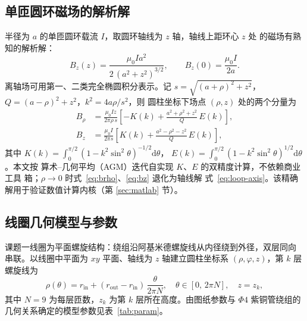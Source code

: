 \documentclass[zihao=-4,a4paper]{ctexart}
\numberwithin{figure}{section}
\numberwithin{table}{section}
\numberwithin{equation}{section}
\begin{document}
\subsection{单匝圆环磁场的解析解}

半径为 $a$ 的单匝圆环载流 $I$，取圆环轴线为 $z$ 轴，轴线上距环心 $z$ 处
的磁场有熟知的解析解：
\begin{equation}
  B_z(z) = \frac{\mu_0 I a^2}{2\,(a^2+z^2)^{3/2}},
  \qquad
  B_z(0) = \frac{\mu_0 I}{2a}.
  \label{eq:loop-axis}
\end{equation}
离轴场可用第一、二类完全椭圆积分表示\cite{smythe1989,jackson1999}。记
$s=\sqrt{(a+\rho)^2+z^2}$，$Q=(a-\rho)^2+z^2$，$k^2 = 4a\rho/s^2$，则
圆柱坐标下场点 $(\rho,z)$ 处的两个分量为
\begin{align}
  B_\rho &= \frac{\mu_0 I z}{2\pi \rho\, s}
            \left[ -K(k) + \frac{a^2+\rho^2+z^2}{Q}\,E(k) \right],
  \label{eq:brho}\\
  B_z    &= \frac{\mu_0 I}{2\pi s}
            \left[ K(k) + \frac{a^2-\rho^2-z^2}{Q}\,E(k) \right],
  \label{eq:bz}
\end{align}
其中 $K(k)=\int_0^{\pi/2}(1-k^2\sin^2\theta)^{-1/2}\mathrm{d}\theta$，
$E(k)=\int_0^{\pi/2}(1-k^2\sin^2\theta)^{1/2}\mathrm{d}\theta$。本文按
算术--几何平均（AGM）迭代自实现 $K$、$E$ 的双精度计算，不依赖商业工具
箱；$\rho\to 0$ 时式~\eqref{eq:brho}、\eqref{eq:bz} 退化为轴线解
式~\eqref{eq:loop-axis}。该精确解用于验证数值计算内核（第
\ref{sec:matlab} 节）。

\subsection{线圈几何模型与参数}

课题一线圈为平面螺旋结构：绕组沿阿基米德螺旋线从内径绕到外径，双层同向
串联。以线圈中平面为 $xy$ 平面、轴线为 $z$ 轴建立圆柱坐标系
$(\rho,\varphi,z)$，第 $k$ 层螺旋线为
\begin{equation}
  \rho(\theta) = r_\mathrm{in} + (r_\mathrm{out}-r_\mathrm{in})\,\frac{\theta}{2\pi N},
  \quad \theta\in[0,\,2\pi N],\quad z = z_k,
  \label{eq:spiral}
\end{equation}
其中 $N=9$ 为每层匝数，$z_k$ 为第 $k$ 层所在高度。由图纸参数与 $\Phi 4$
紫铜管绕组的几何关系确定的模型参数见表~\ref{tab:param}。
\end{document}
